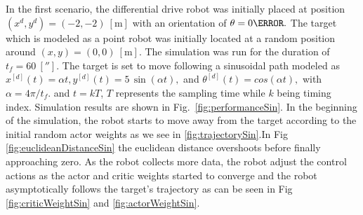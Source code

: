 \documentclass[conference]{IEEEtran}
\begin{document}
 
 In the first scenario, the differential drive robot was initially placed at position $(x^d,y^d) = (-2,-2)~[\si{\meter}] $ with an orientation of $\theta = 0\degree.$ The target which is modeled as a point robot was initially located at a random position around  $(x,y) = (0,0)~[\si{\meter}].$ The simulation was run for the duration of $t_f=60~[\second].$ The target is set to move following a sinusoidal path modeled as  $
 x^{[d]}(t) = \alpha t, %
 y^{[d]}(t) = 5 \,\sin(\alpha t),$  and %
 $\theta^{[d]}(t) = cos(\alpha t),
 $ with $\alpha = 4\pi/t_f.$ and $t=kT$, $T$ represents the sampling time while $k$ being timing index. Simulation results are shown in Fig.~\ref{fig:performanceSin}. In the beginning of the simulation, the robot starts to move away from the target according to the initial random actor weights as we see in \ref{fig:trajectorySin}.In Fig \ref{fig:euclideanDistanceSin} the euclidean distance overshoots before finally approaching zero. As the robot collects more data, the robot adjust the control actions as the actor and critic weights started to converge and the robot asymptotically follows the target's trajectory as can be seen in Fig \ref{fig:criticWeightSin} and \ref{fig:actorWeightSin}. %
%
\end{document}
